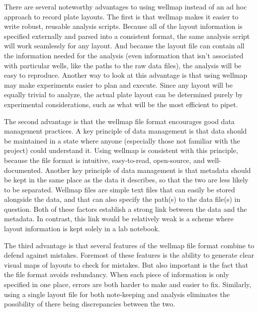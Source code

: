 \documentclass{bmcart}
\begin{document}
There are several noteworthy advantages to using wellmap instead
of an ad hoc approach to record plate layouts. The first is that wellmap
makes it easier to write robust, reusable analysis scripts. Because
all of the layout information is specified externally and parsed into
a consistent format, the same analysis script will work seamlessly
for any layout. And because the layout file can contain all the information
needed for the analysis (even information that isn't associated with
particular wells, like the paths to the raw data files), the analysis
will be easy to reproduce. Another way to look at this advantage is
that using wellmap may make experiments easier to plan and execute.
Since any layout will be equally trivial to analyze, the actual plate
layout can be determined purely by experimental considerations, such
as what will be the most efficient to pipet. 

The second advantage is that the wellmap file format encourages good
data management practices. A key principle of data management is that
data should be maintained in a state where anyone (especially those
not familiar with the project) could understand it. Using wellmap
is consistent with this principle, because the file format is intuitive,
easy-to-read, open-source, and well-documented. Another key principle
of data management is that metadata should be kept in the same place
as the data it describes, so that the two are less likely to be separated.
Wellmap files are simple text files that can easily be stored alongside
the data, and that can also specify the path(s) to the data file(s)
in question. Both of these factors establish a strong link between
the data and the metadata. In contrast, this link would be relatively
weak is a scheme where layout information is kept solely in a lab
notebook.

The third advantage is that several features of the wellmap file
format combine to defend against mistakes. Foremost of these features
is the ability to generate clear visual maps of layouts to check for
mistakes. But also important is the fact that the file format avoids
redundancy. When each piece of information is only specified in one
place, errors are both harder to make and easier to fix. Similarly,
using a single layout file for both note-keeping and analysis eliminates
the possibility of there being discrepancies between the two.
\end{document}
